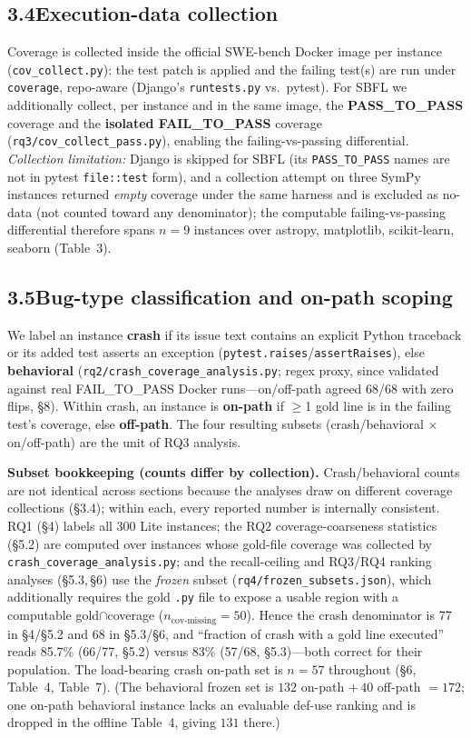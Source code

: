 \documentclass[11pt]{article}
\newcommand{\code}[1]{\texttt{#1}}
\begin{document}
\subsection*{3.4\quad Execution-data collection}
Coverage is collected inside the official SWE-bench Docker image per instance (\code{cov\_collect.py}): the test patch is applied and the failing test(s) are run under \code{coverage}, repo-aware (Django's \code{runtests.py} vs.\ pytest). For SBFL we additionally collect, per instance and in the same image, the \textbf{PASS\_TO\_PASS} coverage and the \textbf{isolated FAIL\_TO\_PASS} coverage (\code{rq3/cov\_collect\_pass.py}), enabling the failing-vs-passing differential. \emph{Collection limitation:} Django is skipped for SBFL (its \code{PASS\_TO\_PASS} names are not in pytest \code{file::test} form), and a collection attempt on three SymPy instances returned \emph{empty} coverage under the same harness and is excluded as no-data (not counted toward any denominator); the computable failing-vs-passing differential therefore spans $n{=}9$ instances over astropy, matplotlib, scikit-learn, seaborn (Table~3).

\subsection*{3.5\quad Bug-type classification and on-path scoping}
We label an instance \textbf{crash} if its issue text contains an explicit Python traceback or its added test asserts an exception (\code{pytest.raises}/\code{assertRaises}), else \textbf{behavioral} (\code{rq2/crash\_coverage\_analysis.py}; regex proxy, since validated against real FAIL\_TO\_PASS Docker runs---on/off-path agreed 68/68 with zero flips, \S8). Within crash, an instance is \textbf{on-path} if $\ge$1 gold line is in the failing test's coverage, else \textbf{off-path}. The four resulting subsets (crash/behavioral $\times$ on/off-path) are the unit of RQ3 analysis.

\smallskip\noindent\textbf{Subset bookkeeping (counts differ by collection).} Crash/behavioral counts are not identical across sections because the analyses draw on different coverage collections (\S3.4); within each, every reported number is internally consistent. RQ1 (\S4) labels all 300 Lite instances; the RQ2 coverage-coarseness statistics (\S5.2) are computed over instances whose gold-file coverage was collected by \code{crash\_coverage\_analysis.py}; and the recall-ceiling and RQ3/RQ4 ranking analyses (\S5.3,\,\S6) use the \emph{frozen} subset (\code{rq4/frozen\_subsets.json}), which additionally requires the gold \code{.py} file to expose a usable region with a computable gold$\cap$coverage ($n_{\text{cov-missing}}{=}50$). Hence the crash denominator is 77 in \S4/\S5.2 and 68 in \S5.3/\S6, and ``fraction of crash with a gold line executed'' reads 85.7\% (66/77, \S5.2) versus 83\% (57/68, \S5.3)---both correct for their population. The load-bearing crash on-path set is $n{=}57$ throughout (\S6, Table~4, Table~7). (The behavioral frozen set is $132$ on-path $+\,40$ off-path $=172$; one on-path behavioral instance lacks an evaluable def-use ranking and is dropped in the offline Table~4, giving $131$ there.)
\end{document}
